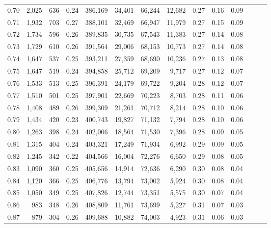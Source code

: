 \begin{tabular}{rrrrrrrrrrrrrr}
0.70 &   2,025 &    636 &  0.24 &  386,169 &   34,401 &  66,244 &  12,682 &  0.27 &  0.16 &      0.09 \\
0.71 &   1,932 &    703 &  0.27 &  388,101 &   32,469 &  66,947 &  11,979 &  0.27 &  0.15 &      0.09 \\
0.72 &   1,734 &    596 &  0.26 &  389,835 &   30,735 &  67,543 &  11,383 &  0.27 &  0.14 &      0.08 \\
0.73 &   1,729 &    610 &  0.26 &  391,564 &   29,006 &  68,153 &  10,773 &  0.27 &  0.14 &      0.08 \\
0.74 &   1,647 &    537 &  0.25 &  393,211 &   27,359 &  68,690 &  10,236 &  0.27 &  0.13 &      0.08 \\
0.75 &   1,647 &    519 &  0.24 &  394,858 &   25,712 &  69,209 &   9,717 &  0.27 &  0.12 &      0.07 \\
0.76 &   1,533 &    513 &  0.25 &  396,391 &   24,179 &  69,722 &   9,204 &  0.28 &  0.12 &      0.07 \\
0.77 &   1,510 &    501 &  0.25 &  397,901 &   22,669 &  70,223 &   8,703 &  0.28 &  0.11 &      0.06 \\
0.78 &   1,408 &    489 &  0.26 &  399,309 &   21,261 &  70,712 &   8,214 &  0.28 &  0.10 &      0.06 \\
0.79 &   1,434 &    420 &  0.23 &  400,743 &   19,827 &  71,132 &   7,794 &  0.28 &  0.10 &      0.06 \\
0.80 &   1,263 &    398 &  0.24 &  402,006 &   18,564 &  71,530 &   7,396 &  0.28 &  0.09 &      0.05 \\
0.81 &   1,315 &    404 &  0.24 &  403,321 &   17,249 &  71,934 &   6,992 &  0.29 &  0.09 &      0.05 \\
0.82 &   1,245 &    342 &  0.22 &  404,566 &   16,004 &  72,276 &   6,650 &  0.29 &  0.08 &      0.05 \\
0.83 &   1,090 &    360 &  0.25 &  405,656 &   14,914 &  72,636 &   6,290 &  0.30 &  0.08 &      0.04 \\
0.84 &   1,120 &    366 &  0.25 &  406,776 &   13,794 &  73,002 &   5,924 &  0.30 &  0.08 &      0.04 \\
0.85 &   1,050 &    349 &  0.25 &  407,826 &   12,744 &  73,351 &   5,575 &  0.30 &  0.07 &      0.04 \\
0.86 &     983 &    348 &  0.26 &  408,809 &   11,761 &  73,699 &   5,227 &  0.31 &  0.07 &      0.03 \\
0.87 &     879 &    304 &  0.26 &  409,688 &   10,882 &  74,003 &   4,923 &  0.31 &  0.06 &      0.03 \\

\end{tabular}
